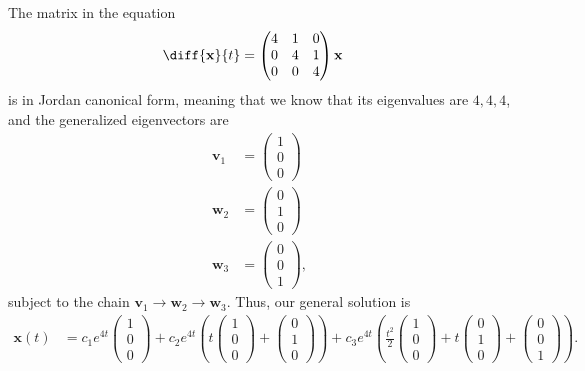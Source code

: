 \documentclass[10pt]{mypackage}
\begin{document}
\begin{solution}[8.2, Problem 28]
  The matrix in the equation
  \begin{align*}
    \diff{\mathbf{x}}{t} &= \begin{pmatrix}4 & 1 & 0 \\ 0 & 4 & 1 \\ 0 & 0 & 4\end{pmatrix} \mathbf{x}
  \end{align*}
  is in Jordan canonical form, meaning that we know that its eigenvalues are $4,4,4$, and the generalized eigenvectors are
  \begin{align*}
    \mathbf{v}_1 &= \begin{pmatrix}1\\0\\0\end{pmatrix}\\
    \mathbf{w}_2 &= \begin{pmatrix}0\\1\\0\end{pmatrix}\\
    \mathbf{w}_3 &= \begin{pmatrix}0\\0\\1\end{pmatrix},
  \end{align*}
  subject to the chain $\mathbf{v}_1\rightarrow \mathbf{w}_2 \rightarrow \mathbf{w}_3$. Thus, our general solution is
  \begin{align*}
    \mathbf{x}(t) &= c_1e^{4t}  \begin{pmatrix}1\\0\\0\end{pmatrix} + c_2e^{4t} \left( t\begin{pmatrix}1\\0\\0\end{pmatrix} + \begin{pmatrix}0\\1\\0\end{pmatrix} \right) + c_3e^{4t} \left( \frac{t^2}{2} \begin{pmatrix}1\\0\\0\end{pmatrix} + t \begin{pmatrix}0\\1\\0\end{pmatrix} + \begin{pmatrix}0\\0\\1\end{pmatrix} \right).
  \end{align*}
\end{solution}
\end{document}

